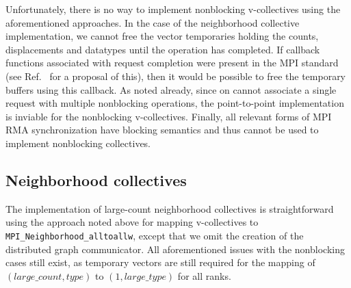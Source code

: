 

Unfortunately, there is no way to implement nonblocking v-collectives using 
the aforementioned approaches.  In the case of the neighborhood collective
implementation, we cannot free the vector temporaries holding the counts,
displacements and datatypes until the operation has completed.
If callback functions associated with request completion were present in the
MPI standard (see Ref.~\cite{ticket26} for a proposal of this), then it would
be possible to free the temporary buffers using this callback.
As noted already, since on cannot associate a single request with multiple
nonblocking operations, the point-to-point implementation is inviable
for the nonblocking v-collectives.
Finally, all relevant forms of MPI RMA synchronization have blocking semantics
and thus cannot be used to implement nonblocking collectives.

\subsection{Neighborhood collectives}


The implementation of large-count neighborhood collectives is straightforward
using the approach noted above for mapping v-collectives to \texttt{MPI\_Neighborhood\_alltoallw},
except that we omit the creation of the distributed graph communicator.
All aforementioned issues with the nonblocking cases still exist, as temporary vectors
are still required for the mapping of $(large\_count,type)$ to $(1,large\_type)$ for all ranks.



